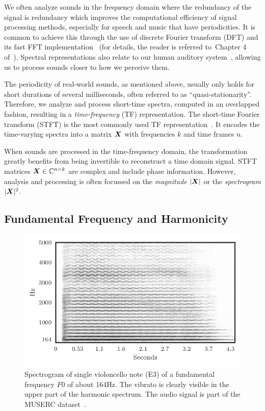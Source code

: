 We often analyze sounds in the frequency domain where the redundancy of the signal is redundancy which improves the computational efficiency of signal processing methods, especially for speech and music that have periodicities.
It is common to achieve this through the use of discrete Fourier transform (DFT) and its fast FFT implementation~\cite{cooley65} (for details, the reader is referred to~Chapter 4 of~\cite{proakis96}).
Spectral representations also relate to our human auditory system~\cite{zwicker13, moore89}, allowing us to process sounds closer to how we perceive them.
\par
The periodicity of real-world sounds, as mentioned above, usually only holds for short durations of several milliseconds, often referred to as ``quasi-stationarity''.
Therefore, we analyze and process short-time spectra, computed in an overlapped fashion, resulting in a \emph{time-frequency} (TF) representation.
The short-time Fourier transform (STFT) is the most commonly used TF representation~\cite{mcaulay86}.
It encodes the time-varying spectra into a matrix \({\bm{X}}\) with frequencies \(k\) and time frames \(n\).
\par
When sounds are processed in the time-frequency domain, the transformation greatly benefits from being invertible to reconstruct a time domain signal.
STFT matrices \({\bm{X}} \in {\mathbb{C}}^{n \times k}\) are complex and include phase information.
However, analysis and processing is often focussed  on the \emph{magnitude} \(|{\bm{X}}|\) or the \emph{spectrogram} \(|{\bm{X}}|^2\).

\subsection{Fundamental Frequency and Harmonicity}

\begin{figure}[h]
  \centering
  \includegraphics[width=0.8\columnwidth]{gfx/cello.pdf}
  \caption{Spectrogram of single violoncello note (E3) of a fundamental frequency \(F0\) of about 164\si{\hertz}. The vibrato is clearly visible in the upper part of the harmonic spectrum. The audio signal is part of the MUSERC dataset~\cite{stoeter15acm}.}%
  \label{fig:cello_example}%
\end{figure}

